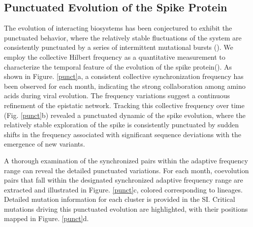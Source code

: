 \documentclass{sysbio}%
\begin{document}
\subsection{Punctuated Evolution of the Spike Protein}
The evolution of interacting biosystems has been conjectured to exhibit the punctuated behavior, where the relatively stable fluctuations of the system are consistently punctuated by a series of intermittent mutational bursts (\cite{bak1993punctuated,bak1989self}). We employ the collective Hilbert frequency as a quantitative measurement to characterize the temporal feature of the evolution of the spike protein(\cite{huang2014hilbert}). %
As shown in Figure. \ref{punct}a, a consistent collective synchronization frequency has been observed for each month, indicating the strong collaboration among amino acids during viral evolution. The frequency variations suggest a continuous refinement of the epistatic network. Tracking this collective frequency over time (Fig. \ref{punct}b) revealed a punctuated dynamic of the spike evolution, where the relatively stable exploration of the spike is consistently punctuated by sudden shifts in the frequency associated with significant sequence deviations with the emergence of new variants. %

A thorough examination of the synchronized pairs within the adaptive frequency range can reveal the detailed punctuated variations. For each month, coevolution pairs that fall within the designated synchronized adaptive frequency range are extracted and illustrated in Figure. \ref{punct}c, colored corresponding to lineages. Detailed mutation information for each cluster is provided in the SI. Critical mutations driving this punctuated evolution are highlighted, with their positions mapped in Figure. \ref{punct}d.

\end{document}
